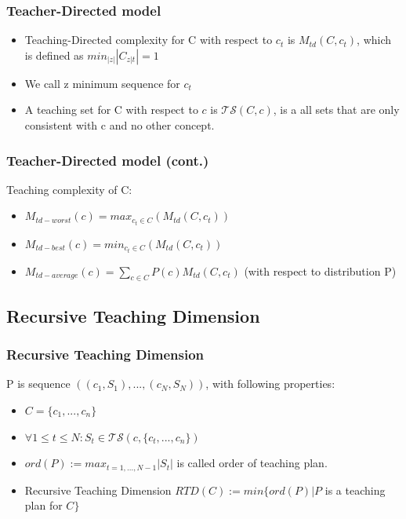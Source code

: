 \documentclass{beamer}
\begin{document}
\begin{frame}
\frametitle{Teacher-Directed model}
\begin{itemize}
\item Teaching-Directed complexity for C with respect to $c_t$ is $M_{td}(C,c_t)$, which is defined as  $min_{|z|}|C_{z|t}| = 1$
\item We call z minimum sequence for $c_t$
\item A teaching set for C with respect to $c$ is $\mathcal{TS}(C,c)$, is a all sets that are only consistent with c and no other concept.

\end{itemize}

\end{frame}

\begin{frame}
\frametitle{Teacher-Directed model (cont.)}


Teaching complexity of C:
\begin{itemize}
\item $M_{td-worst}(c) = max_{c_t \in C}(M_{td}(C, c_t))$
\item $M_{td-best}(c) = min_{c_t \in C}(M_{td}(C, c_t))$
\item $M_{td-average}(c) = \sum_{c\in C}P(c)M_{td}(C, c_t)$ (with respect to distribution P)
\end{itemize}


\end{frame}



\subsection{Recursive Teaching Dimension}
\begin{frame}
\frametitle{Recursive Teaching Dimension}



\begin{definition}
P is sequence $((c_1, S_1), ..., (c_N, S_N))$, with following properties:
\begin{itemize}
\item $C = \{c_1, ..., c_n\}$
\item $\forall 1 \leq t \leq N: S_t \in \mathcal{TS}(c,\{c_t, ..., c_n\})$
\end{itemize}
\end{definition}

\begin{itemize}
\item $ord(P) := max_{t=1, ..., N-1} |S_t|$ is called order of teaching plan.
\item Recursive Teaching Dimension $RTD(C) := min\{ord(P)|P$ is a teaching plan for $C\}$
\end{itemize}
\end{frame}
\end{document}
